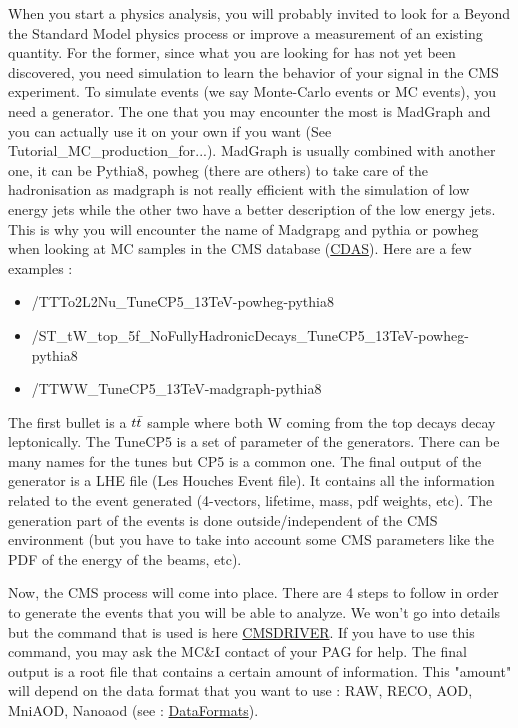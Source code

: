 \documentclass[reprint, a4paper, nofootinbib, amsmath, amssymb, aps]{revtex4-1}
\begin{document}
    When you start a physics analysis, you will probably invited to look for a Beyond the Standard Model physics process or improve a measurement of an existing quantity. For the former, since what you are looking for has not yet been discovered, you need simulation to learn the behavior of your signal in the CMS experiment. To simulate events (we say Monte-Carlo events or MC events), you need a generator. The one that you may encounter the most is MadGraph and you can actually use it on your own if you want (See Tutorial\_MC\_production\_for...). MadGraph is usually combined with another one, it can be Pythia8, powheg (there are others) to take care of the hadronisation as madgraph is not really efficient with the simulation of low energy jets while the other two have a better description of the low energy jets.  This is why you will encounter the name of Madgrapg and pythia or powheg when looking at MC samples in the CMS database (\href{https://cmsweb.cern.ch/das/}{CDAS}). Here are a few examples :\begin{itemize}
        \item /TTTo2L2Nu\_TuneCP5\_13TeV-powheg-pythia8
        \item /ST\_tW\_top\_5f\_NoFullyHadronicDecays\_TuneCP5\_13TeV-powheg-pythia8
        \item /TTWW\_TuneCP5\_13TeV-madgraph-pythia8
    \end{itemize}
    The first bullet is a $t\Bar{t}$ sample where both W coming from the top decays decay leptonically. The TuneCP5 is a set of parameter of the generators. There can be many names for the tunes but CP5 is a common one. The final output of the generator is a LHE file (Les Houches Event file). It contains all the information related to the event generated (4-vectors, lifetime, mass, pdf weights, etc). The generation part of the events is done outside/independent of the CMS environment (but you have to take into account some CMS parameters like the PDF of the energy of the beams, etc).

    Now, the CMS process will come into place. There are 4 steps to follow in order to generate the events that you will be able to analyze.    
    We won't go into details but the command that is used is here \href{https://twiki.cern.ch/twiki/bin/view/CMSPublic/SWGuideCmsDriver}{CMSDRIVER}. If you have to use this command, you may ask the MC\&I contact of your PAG for help. The final output is a root file that contains a certain amount of information. This "amount" will depend on the data format that you want to use : RAW, RECO, AOD, MniAOD, Nanoaod (see : \href{https://twiki.cern.ch/twiki/bin/view/CMSPublic/WorkBookAnalysisOverviewIntroduction}{DataFormats}). 
 
\end{document}
